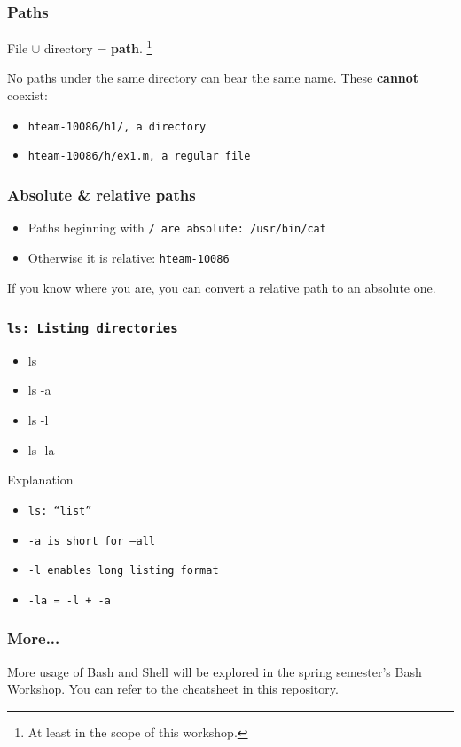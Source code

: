 \documentclass[aspectratio=169]{beamer}
\begin{document}
\begin{frame}
  \frametitle{Paths}
  File $\cup$ directory = \textbf{path}.
  \footnote{At least in the scope of this workshop.}
  \newline \newline

  No paths under the same directory can bear the same name.
  These \textbf{cannot} coexist:
  \begin{itemize}
    \item \tt{hteam-10086/h1/}, a directory
    \item \tt{hteam-10086/h/ex1.m}, a regular file
  \end{itemize}
\end{frame}

\begin{frame}
  \frametitle{Absolute \& relative paths}
  \begin{itemize}
    \item Paths beginning with \tt{/} are absolute: \tt{/usr/bin/cat}
    \item Otherwise it is relative: \tt{hteam-10086}
  \end{itemize}

  If you know where you are, you can convert a relative path to an absolute one.
\end{frame}

\begin{frame}
  \frametitle{\tt{ls}: Listing directories}
  \begin{itemize}
    \item ls
    \item ls -a
    \item ls -l
    \item ls -la
  \end{itemize}
  \begin{block}{Explanation}
      \begin{itemize}
          \item \tt{ls}: ``list''
          \item \tt{-a} is short for \tt{--all}
          \item \tt{-l} enables long listing format
          \item \tt{-la} = \tt{-l} + \tt{-a}
      \end{itemize}
  \end{block}
\end{frame}

\begin{frame}
  \frametitle{More...}
  More usage of Bash and Shell will be explored in the spring semester's Bash Workshop. You can refer to the cheatsheet in this repository.
\end{frame}
\end{document}
